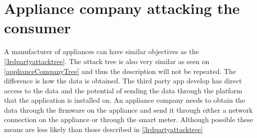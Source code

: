 
\section{Appliance company attacking the consumer}
A manufacturer of appliances can have similar objectives as the \cref{3rdpartyattacktree}.
The attack tree is also very similar as seen on \cref{applianceCompanyTree} and thus the description will not be repeated.
The difference is how the data is obtained.
The third party app develop has direct access to the data and the potential of sending the data through the platform that the application is installed on.
An appliance company needs to obtain the data through the firmware on the appliance and send it through either a network connection on the appliance or through the smart meter.
Although possible these means are less likely than those described in \cref{3rdpartyattacktree}


